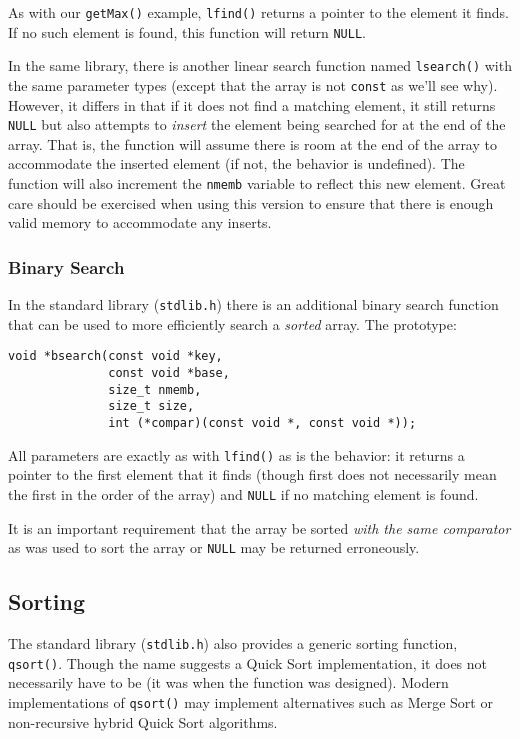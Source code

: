 As with our \texttt{getMax()} example, \texttt{lfind()} returns
a pointer to the element it finds.  If no such element is found, this function
will return \texttt{NULL}.  

In the same library, there is another linear search function named 
\texttt{lsearch()} with the same parameter types (except that the array
is not \texttt{const} as we'll see why).  However, it differs
in that if it does not find a matching element, it still returns \texttt{NULL}
but also attempts to \emph{insert} the element being searched for at the
end of the array.  That is, the function will assume there is room at the end
of the array to accommodate the inserted element (if not, the behavior is undefined).
The function will also increment the \texttt{nmemb} variable to reflect
this new element.  Great care should be exercised when using this version to ensure
that there is enough valid memory to accommodate any inserts.

\subsubsection{Binary Search}

In the standard library (\texttt{stdlib.h}) there is an additional binary
search function that can be used to more efficiently search a \emph{sorted}
array.  The prototype:

\begin{verbatim}
void *bsearch(const void *key, 
              const void *base, 
              size_t nmemb, 
              size_t size, 
              int (*compar)(const void *, const void *));
\end{verbatim}

All parameters are exactly as with \texttt{lfind()} as is the behavior:
it returns a pointer to the first element that it finds (though first does not  
necessarily mean the first in the order of the array) and \texttt{NULL} if 
no matching element is found.

It is an important requirement that the array be sorted \emph{with the same
comparator} as was used to sort the array or \texttt{NULL} may be 
returned erroneously.

\subsection{Sorting}

The standard library (\texttt{stdlib.h}) also provides a generic sorting
function, \texttt{qsort()}.  Though the name suggests a Quick Sort implementation, it does not necessarily have to be (it was when the function was
designed).  Modern implementations of \texttt{qsort()} may implement 
alternatives such as Merge Sort or non-recursive hybrid Quick Sort algorithms.

